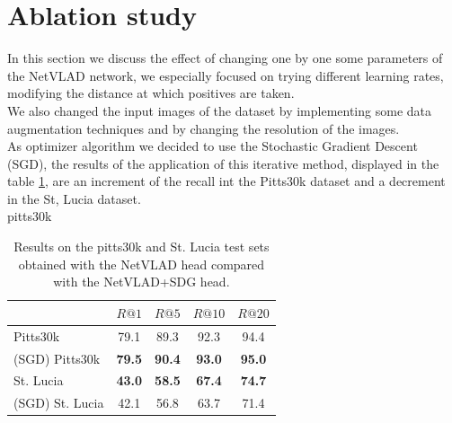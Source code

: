 \documentclass[10pt,twocolumn,letterpaper]{article}
\begin{document}
\section{Ablation study}
In this section we discuss the effect of changing one by one some parameters of the NetVLAD network, we especially focused on trying different learning rates, modifying the distance at which positives are taken.\\ We also changed the input images of the dataset by implementing some data augmentation techniques and by changing the resolution of the images.\\
As optimizer algorithm we decided to use the Stochastic Gradient Descent (SGD), the results of the application of this iterative method, displayed in the table \ref{tab:SGD}, are an increment of the recall int the Pitts30k dataset and a decrement in the St, Lucia dataset.\\
pitts30k
\begin{table}[!h]
	\centering
	\begin{tabular}{|l|c|c|c|c|}
		\hline
		&        $R@1$   &        $R@5$   &        $R@10$  &        $R@20$   \\ \hline
		 Pitts30k     &         79.1   &         89.3   &          92.3   &          94.4   \\
		(SGD) Pitts30k  &         \textbf{79.5}   &         \textbf{90.4}   &          \textbf{93.0}   &          \textbf{95.0}   \\ \hline
		St. Lucia        &         \textbf{43.0}   &         \textbf{58.5}   &          \textbf{67.4}   &          \textbf{74.7}   \\
		(SGD) St. Lucia      &         42.1   & 56.8  &  63.7  &  71.4  \\
		 \hline
	\end{tabular}
	\caption{Results on the pitts30k and St. Lucia test sets obtained with the NetVLAD head compared with the NetVLAD+SDG head.}
	\label{tab:SGD}
\end{table}
\end{document}
